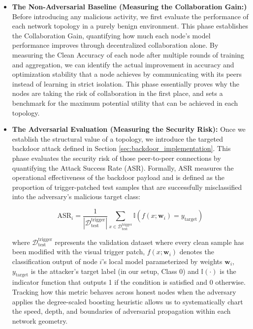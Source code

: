\begin{itemize}
    \item \textbf{The Non-Adversarial Baseline (Measuring the Collaboration Gain:)} Before introducing any malicious activity, we first evaluate the performance of each network topology in a purely benign environment. This phase establishes the Collaboration Gain, quantifying how much each node's model performance improves through decentralized collaboration alone. By measuring the Clean Accuracy of each node after multiple rounds of training and aggregation, we can identify the actual improvement in accuracy and optimization stability that a node achieves by communicating with its peers instead of learning in strict isolation. This phase essentially proves why the nodes are taking the risk of collaboration in the first place, and sets a benchmark for the maximum potential utility that can be achieved in each topology.
    \item \textbf{The Adversarial Evaluation (Measuring the Security Risk):} Once we establish the structural value of a topology, we introduce the targeted backdoor attack defined in Section \ref{sec:backdoor_implementation}. This phase evaluates the security risk of those peer-to-peer connections by quantifying the Attack Success Rate (ASR). Formally, ASR measures the operational effectiveness of the backdoor payload and is defined as the proportion of trigger-patched test samples that are successfully misclassified into the adversary's malicious target class:

    \begin{equation}
        \text{ASR}_i = \frac{1}{|\mathcal{D}_{\text{test}}^{\text{trigger}}|} \sum_{x \in \mathcal{D}_{\text{test}}^{\text{trigger}}} \mathbb{I}\left(f(x; \mathbf{w}_i) = y_{\text{target}}\right)
    \end{equation}

    where $\mathcal{D}_{\text{test}}^{\text{trigger}}$ represents the validation dataset where every clean sample has been modified with the visual trigger patch, $f(x; \mathbf{w}_i)$ denotes the classification output of node $i$'s local model parameterized by weights $\mathbf{w}_i$, $y_{\text{target}}$ is the attacker's target label (in our setup, Class 0) and $\mathbb{I}(\cdot)$ is the indicator function that outputs 1 if the condition is satisfied and 0 otherwise. Tracking how this metric behaves across honest nodes when the adversary applies the degree-scaled boosting heuristic allows us to systematically chart the speed, depth, and boundaries of adversarial propagation within each network geometry.
\end{itemize}